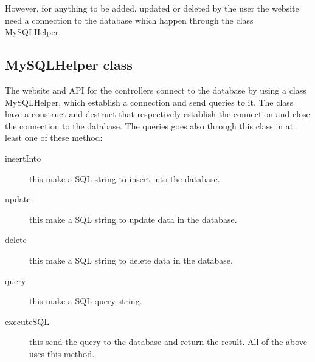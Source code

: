 However, for anything to be added, updated or deleted by the user the website need a connection to the database which happen through the class MySQLHelper. 

\subsection{MySQLHelper class}
The website and API for the controllers connect to the database by using a class MySQLHelper, which establish a connection and send queries to it. The class have a construct and destruct that respectively establish the connection and close the connection to the database. The queries goes also through this class in at least one of these method:

\begin{description}
	\item[insertInto] this make a SQL string to insert into the database.
	\item[update] this make a SQL string to update data in the database.	
	\item[delete] this make a SQL string to delete data in the database.
	\item[query] this make a SQL query string.
	\item[executeSQL] this send the query to the database and return the result. All of the above uses this method.
\end{description}
  


